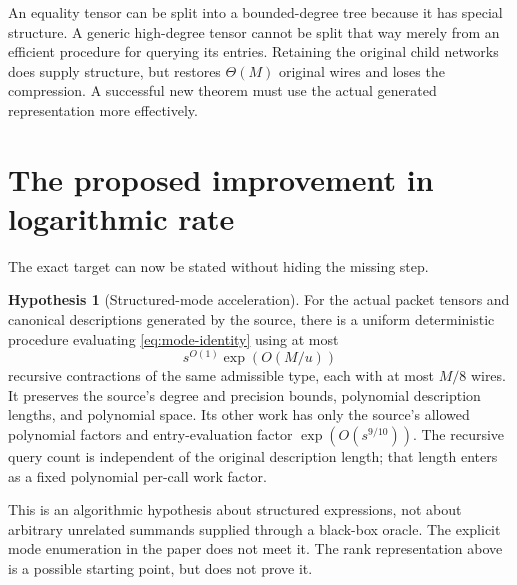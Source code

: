 \documentclass[11pt,letterpaper]{article}
\numberwithin{equation}{section}
\theoremstyle{definition}
\newtheorem{hypothesis}[theorem]{Hypothesis}
\theoremstyle{remark}
\begin{document}
An equality tensor can be split into a bounded-degree tree because it has
special structure. A generic high-degree tensor cannot be split that way
merely from an efficient procedure for querying its entries. Retaining the
original child networks does supply structure, but restores $\Theta(M)$
original wires and loses the compression. A successful new theorem must
use the actual generated representation more effectively.

\section{The proposed improvement in logarithmic rate}
\label{sec:conditional}

The exact target can now be stated without hiding the missing step.

\begin{hypothesis}[Structured-mode acceleration]
\label{hyp:acceleration}
For the actual packet tensors and canonical descriptions generated by the
source, there is a uniform deterministic procedure evaluating
\eqref{eq:mode-identity} using at most
\[
 s^{O(1)}\exp(O(M/u))
\]
recursive contractions of the same admissible type, each with at most
$M/8$ wires. It preserves the source's degree and precision bounds,
polynomial description lengths, and polynomial space. Its other work has
only the source's allowed polynomial factors and entry-evaluation factor
$\exp(O(s^{9/10}))$. The recursive query count is independent of the
original description length; that length enters as a fixed polynomial
per-call work factor.
\end{hypothesis}

This is an algorithmic hypothesis about structured expressions, not about
arbitrary unrelated summands supplied through a black-box oracle. The
explicit mode enumeration in the paper does not meet it. The rank
representation above is a possible starting point, but does not prove it.
\end{document}
